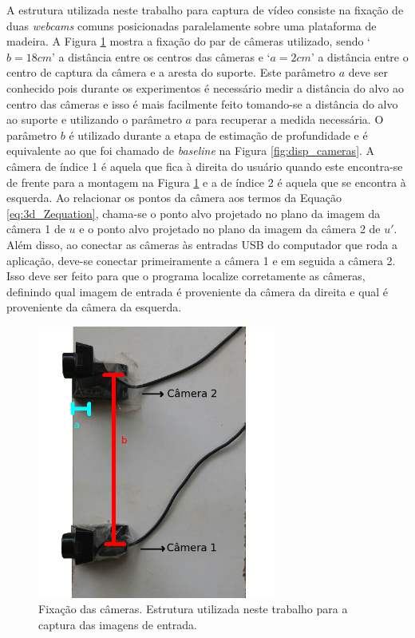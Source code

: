 A estrutura utilizada neste trabalho para captura de vídeo consiste na fixação
de duas \textit{webcams} comuns posicionadas paralelamente sobre uma plataforma
de madeira. A Figura \ref{fig:setupCameras} mostra a fixação do par de câmeras
utilizado, sendo `$b = 18cm$'  a distância entre os centros das câmeras e `$a =
2 cm$' a distância entre o centro de captura da câmera e a aresta do suporte.
Este parâmetro $a$ deve ser conhecido pois durante os experimentos é necessário
medir a distância do alvo ao centro das câmeras e isso é mais facilmente feito
tomando-se a distância do alvo ao suporte e utilizando o parâmetro $a$ para
recuperar a medida necessária. O parâmetro $b$ é utilizado durante a etapa de
estimação de profundidade e é equivalente ao que foi chamado de
\textit{baseline} na Figura \ref{fig:disp_cameras}. A câmera de índice 1 é
aquela que fica à direita do usuário quando este encontra-se de frente para a
montagem na Figura \ref{fig:setupCameras} e a de índice 2 é aquela que se
encontra à esquerda. Ao relacionar os pontos da câmera aos termos da Equação
\ref{eq:3d_Zequation}, chama-se o ponto alvo projetado no plano da imagem da
câmera 1 de $u$ e o ponto alvo projetado no plano da imagem da câmera 2 de $u'$.
Além disso, ao conectar as câmeras às entradas USB do computador que roda a
aplicação, deve-se conectar primeiramente a câmera 1 e em seguida a câmera 2.
Isso deve ser feito para que o programa localize corretamente as câmeras,
definindo qual imagem de entrada é proveniente da câmera da direita e qual é
proveniente da câmera da esquerda. 


\begin{figure}[!htb]
\centering
\includegraphics[width=0.7\textwidth]{figs/setupExperimento-marcado_edit-2.png}
\caption{Fixação das câmeras. Estrutura utilizada neste trabalho para a captura das imagens de entrada.}
\label{fig:setupCameras}
\end{figure}



